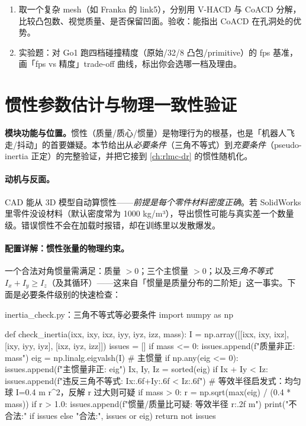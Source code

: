 \begin{practice}[动手：分解与基准]
\begin{enumerate}
  \item 取一个复杂 mesh（如 Franka 的 link5），分别用 V-HACD 与 CoACD 分解，比较凸包数、视觉质量、是否保留凹面。验收：能指出 CoACD 在孔洞处的优势。
  \item 实验题：对 Go1 跑四档碰撞精度（原始/32/8 凸包/primitive）的 fps 基准，画「fps vs 精度」trade-off 曲线，标出你会选哪一档及理由。
\end{enumerate}
\end{practice}

\section{惯性参数估计与物理一致性验证}
\label{sec:rlmc-assets-inertia}

\textbf{模块功能与位置。}惯性（质量/质心/惯量）是物理行为的根基，也是「机器人飞走/抖动」的首要嫌疑。本节给出从\emph{必要条件}（三角不等式）到\emph{充要条件}（pseudo-inertia 正定）的完整验证，并把它接到 \cref{ch:rlmc-dr} 的惯性随机化。

\paragraph{动机与反面。}CAD 能从 3D 模型自动算惯性——\emph{前提是每个零件材料密度正确}。若 SolidWorks 里零件没设材料（默认密度常为 1000 kg/m³），导出惯性可能与真实差一个数量级。错误惯性不会在加载时报错，却在训练里以发散爆发。

\paragraph{配置详解：惯性张量的物理约束。}一个合法对角惯量需满足：质量 $>0$；三个主惯量 $>0$；以及\emph{三角不等式} $I_x+I_y\ge I_z$（及其循环）——这来自「惯量是质量分布的二阶矩」这一事实。下面是必要条件级别的快速检查：

\begin{codebox}[Python]{inertia\_check.py：三角不等式等必要条件}
import numpy as np

def check_inertia(ixx, ixy, ixz, iyy, iyz, izz, mass):
    I = np.array([[ixx, ixy, ixz], [ixy, iyy, iyz], [ixz, iyz, izz]])
    issues = []
    if mass <= 0:
        issues.append(f"质量非正: {mass}")
    eig = np.linalg.eigvalsh(I)              # 主惯量
    if np.any(eig <= 0):
        issues.append(f"主惯量非正: {eig}")
    Ix, Iy, Iz = sorted(eig)
    if Ix + Iy < Iz:
        issues.append(f"违反三角不等式: {Ix:.6f}+{Iy:.6f} < {Iz:.6f}")
    # 等效半径启发式：均匀球 I=0.4 m r^2，反解 r 过大则可疑
    if mass > 0:
        r = np.sqrt(max(eig) / (0.4 * mass))
        if r > 1.0:
            issues.append(f"惯量/质量比可疑: 等效半径 {r:.2f} m")
    print("不合法:" if issues else "合法:", issues or eig)
    return not issues
\end{codebox}

